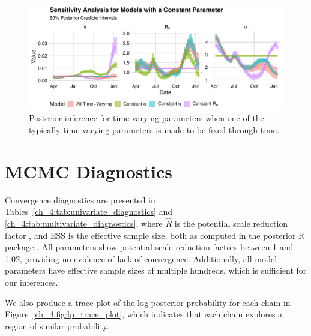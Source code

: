 \begin{figure}[htbp]
    \centering
    \includegraphics[width=1.0\columnwidth]{compare_constant_time_varying_inference_plot}
    \caption{Posterior inference for time-varying parameters when one of the typically time-varying parameters is made to be fixed through time.}
    \label{ch_4:fig:compare_constant_time_varying_inference_plot}
\end{figure}

\section{MCMC Diagnostics}
\label{ch_4:sec:convergence-diagnostics}

Convergence diagnostics are presented in Tables~\ref{ch_4:tab:univariate_diagnostics} and \ref{ch_4:tab:multivariate_diagnostics}, where $\hat{R}$ is the potential scale reduction factor \citep{Vehtari2021}, and ESS is the effective sample size, both as computed in the posterior R package \citep{posteriorPackage}.
All parameters show potential scale reduction factors between 1 and 1.02, providing no evidence of lack of convergence.
Additionally, all model parameters have effective sample sizes of multiple hundreds, which is sufficient for our inferences.

We also produce a trace plot of the log-posterior probability for each chain in Figure~\ref{ch_4:fig:lp_trace_plot}, which indicates that each chain explores a region of similar probability.

